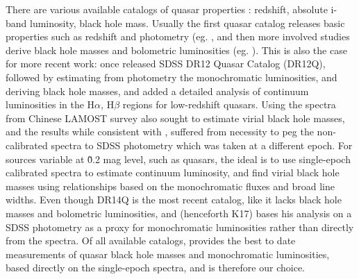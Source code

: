 \documentclass[twocolumn]{aastex62}
\begin{document}
There are various available catalogs of quasar properties : redshift, absolute i-band luminosity, black hole mass.  Usually the first quasar catalog releases basic properties such as redshift and photometry (eg. \citealt{schneider2007, schneider2010}, and then more involved studies derive black hole masses and bolometric luminosities (eg. \citealt{shen2008, shen2011}). This is also the case for more recent work:  once \citep{paris2017} released SDSS DR12 Quasar Catalog (DR12Q),  \citep{kozlowski2017a} followed by estimating from photometry the monochromatic luminosities,  and  deriving black hole masses, and \citep{chen2018} added a detailed analysis of continuum luminosities in the  H$\alpha$, H$\beta$ regions for low-redshift quasars. Using the spectra from Chinese LAMOST survey \citep{dong2018} also sought to estimate virial black hole masses, and the results while consistent with \citep{shen2011}, suffered from necessity to peg the non-calibrated spectra to SDSS photometry which was taken at a different epoch.  For sources variable at \~0.2 mag level, such as quasars, the ideal is to use single-epoch calibrated spectra to estimate continuum luminosity, and find virial black hole masses using relationships based on the monochromatic fluxes and broad line widths. Even though \cite{paris2018} DR14Q is the most recent catalog, like \citep{paris2017} it lacks black hole masses and bolometric luminosities, and \citep{kozlowski2017a} (henceforth K17)  bases his analysis on a SDSS photometry as a proxy for monochromatic luminosities rather than directly from the spectra. Of all available catalogs,  \citep{shen2011} provides the best to date measurements of quasar black hole masses and monochromatic luminosities, based directly on the single-epoch spectra, and is therefore our choice. 
\end{document}
